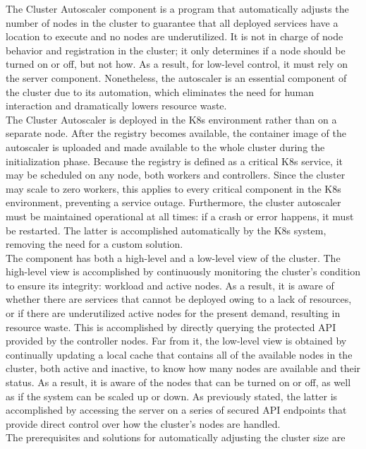 
The Cluster Autoscaler component is a program that automatically adjusts the
number of nodes in the cluster to guarantee that all deployed services have a
location to execute and no nodes are underutilized\cite{cluster_autoscaler}. It
is not in charge of node behavior and registration in the cluster; it only determines
if a node should be turned on or off, but not how. As a result, for low-level
control, it must rely on the server component. Nonetheless, the autoscaler is an
essential component of the cluster due to its automation, which eliminates the
need for human interaction and dramatically lowers resource waste. \\ %
The Cluster Autoscaler is deployed in the K8s environment rather than on a
separate node. After the registry becomes available, the container image of the
autoscaler is uploaded and made available to the whole cluster during the
initialization phase. Because the registry is defined as a critical K8s service,
it may be scheduled on any node, both workers and controllers. Since the cluster
may scale to zero workers, this applies to every critical component in the K8s environment,
preventing a service outage. Furthermore, the cluster autoscaler must be
maintained operational at all times: if a crash or error happens, it must be
restarted. The latter is accomplished automatically by the K8s system, removing
the need for a custom solution. \\ %
The component has both a high-level and a low-level view of the cluster. The high-level
view is accomplished by continuously monitoring the cluster's condition to ensure
its integrity: workload and active nodes. As a result, it is aware of whether
there are services that cannot be deployed owing to a lack of resources, or if there
are underutilized active nodes for the present demand, resulting in resource
waste. This is accomplished by directly querying the protected API provided by the
controller nodes. Far from it, the low-level view is obtained by continually updating
a local cache that contains all of the available nodes in the cluster, both
active and inactive, to know how many nodes are available and their status. As a
result, it is aware of the nodes that can be turned on or off, as well as if the
system can be scaled up or down. As previously stated, the latter is
accomplished by accessing the server on a series of secured API endpoints that
provide direct control over how the cluster's nodes are handled. \\ %
The prerequisites and solutions for automatically adjusting the cluster size are
